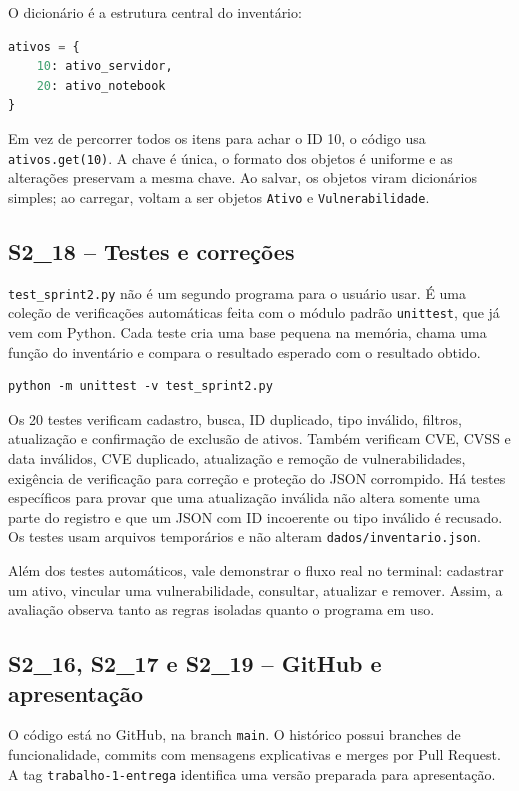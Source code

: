 \documentclass[11pt,a4paper]{article}
\newcommand{\cardsection}[1]{\Needspace{12\baselineskip}\subsection{#1}}
\begin{document}
O dicionário é a estrutura central do inventário:

\begin{lstlisting}[language=Python,caption={Estrutura principal na memória}]
ativos = {
    10: ativo_servidor,
    20: ativo_notebook
}
\end{lstlisting}

Em vez de percorrer todos os itens para achar o ID 10, o código usa \texttt{ativos.get(10)}. A chave é única, o formato dos objetos é uniforme e as alterações preservam a mesma chave. Ao salvar, os objetos viram dicionários simples; ao carregar, voltam a ser objetos \texttt{Ativo} e \texttt{Vulnerabilidade}.

\cardsection{S2\_18 -- Testes e correções}

\texttt{test\_sprint2.py} não é um segundo programa para o usuário usar. É uma coleção de verificações automáticas feita com o módulo padrão \texttt{unittest}, que já vem com Python. Cada teste cria uma base pequena na memória, chama uma função do inventário e compara o resultado esperado com o resultado obtido.

\begin{lstlisting}[caption={Como executar os testes}]
python -m unittest -v test_sprint2.py
\end{lstlisting}

Os 20 testes verificam cadastro, busca, ID duplicado, tipo inválido, filtros, atualização e confirmação de exclusão de ativos. Também verificam CVE, CVSS e data inválidos, CVE duplicado, atualização e remoção de vulnerabilidades, exigência de verificação para correção e proteção do JSON corrompido. Há testes específicos para provar que uma atualização inválida não altera somente uma parte do registro e que um JSON com ID incoerente ou tipo inválido é recusado. Os testes usam arquivos temporários e não alteram \texttt{dados/inventario.json}.

Além dos testes automáticos, vale demonstrar o fluxo real no terminal: cadastrar um ativo, vincular uma vulnerabilidade, consultar, atualizar e remover. Assim, a avaliação observa tanto as regras isoladas quanto o programa em uso.

\cardsection{S2\_16, S2\_17 e S2\_19 -- GitHub e apresentação}

O código está no GitHub, na branch \texttt{main}. O histórico possui branches de funcionalidade, commits com mensagens explicativas e merges por Pull Request. A tag \texttt{trabalho-1-entrega} identifica uma versão preparada para apresentação.
\end{document}
